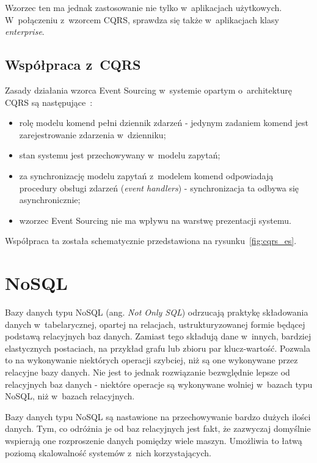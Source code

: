Wzorzec ten ma jednak zastosowanie nie tylko w~aplikacjach użytkowych.
W~połączeniu z~wzorcem CQRS, sprawdza się także w~aplikacjach klasy \emph{enterprise}.


\subsection{Współpraca z~CQRS}

Zasady działania wzorca Event Sourcing w~systemie opartym o~architekturę CQRS są następujące~\cite{cqrs_es}:

\begin{itemize}
 \item rolę modelu komend pełni dziennik zdarzeń - jedynym zadaniem komend jest zarejestrowanie zdarzenia w~dzienniku;
 \item stan systemu jest przechowywany w~modelu zapytań;
 \item za synchronizację modelu zapytań z~modelem komend odpowiadają procedury obsługi zdarzeń (\emph{event handlers}) - synchronizacja ta odbywa się asynchronicznie;
 \item wzorzec Event Sourcing nie ma wpływu na warstwę prezentacji systemu.
\end{itemize}


Współpraca ta została schematycznie przedstawiona na rysunku~\ref{fig:cqrs_es}.





\section{NoSQL}

Bazy danych typu NoSQL (ang. \emph{Not Only SQL}) odrzucają praktykę składowania danych w~tabelarycznej, opartej na relacjach, ustrukturyzowanej formie będącej podstawą relacyjnych baz danych.
Zamiast tego składują dane w~innych, bardziej elastycznych postaciach, na przykład grafu lub zbioru par klucz-wartość.
Pozwala to na wykonywanie niektórych operacji szybciej, niż są one wykonywane przez relacyjne bazy danych.
Nie jest to jednak rozwiązanie bezwględnie lepsze od relacyjnych baz danych - niektóre operacje są wykonywane wolniej w~bazach typu NoSQL, niż w~bazach relacyjnych.

Bazy danych typu NoSQL są nastawione na przechowywanie bardzo dużych ilości danych.
Tym, co odróżnia je od baz relacyjnych jest fakt, że zazwyczaj domyślnie wspierają one rozproszenie danych pomiędzy wiele maszyn.
Umożliwia to łatwą poziomą skalowalność systemów z~nich korzystających.


